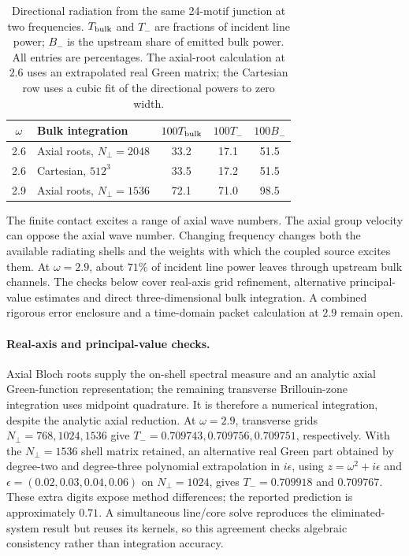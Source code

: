 \documentclass[10pt,aps,onecolumn,notitlepage,nofootinbib]{revtex4-2}
\begin{document}
\begin{table}[t]
 \squeezetable
 \caption{Directional radiation from the same 24-motif junction at two frequencies. $T_{\rm bulk}$ and $T_-$ are fractions of incident line power; $B_-$ is the upstream share of emitted bulk power. All entries are percentages. The axial-root calculation at $2.6$ uses an extrapolated real Green matrix; the Cartesian row uses a cubic fit of the directional powers to zero width.}
 \label{tab:pred-backward}
 \begin{ruledtabular}
 \begin{tabular}{clccc}
 $\omega$ & Bulk integration & $100T_{\rm bulk}$ & $100T_-$ & $100B_-$\\
 \hline
 2.6 & Axial roots, $N_\perp=2048$ & 33.2 & 17.1 & 51.5\\
 2.6 & Cartesian, $512^3$ & 33.5 & 17.2 & 51.5\\
 2.9 & Axial roots, $N_\perp=1536$ & 72.1 & 71.0 & 98.5\\
 \end{tabular}
 \end{ruledtabular}
\end{table}

The finite contact excites a range of axial wave numbers. The axial group
velocity can oppose the axial wave number. Changing frequency changes both
the available radiating shells and the weights with which the coupled
source excites them. At $\omega=2.9$, about $71\%$ of incident line power
leaves through upstream bulk channels. The checks below cover real-axis
grid refinement, alternative principal-value estimates and direct
three-dimensional bulk integration. A combined rigorous error enclosure
and a time-domain packet calculation at $2.9$ remain open.

\paragraph*{Real-axis and principal-value checks.}
Axial Bloch roots supply the on-shell spectral measure and an analytic axial Green-function representation; the remaining transverse Brillouin-zone integration uses midpoint quadrature. It is therefore a numerical integration, despite the analytic axial reduction. At $\omega=2.9$, transverse grids $N_\perp=768,1024,1536$ give $T_-=0.709743,0.709756,0.709751$, respectively. With the $N_\perp=1536$ shell matrix retained, an alternative real Green part obtained by degree-two and degree-three polynomial extrapolation in $i\epsilon$, using $z=\omega^2+i\epsilon$ and $\epsilon=(0.02,0.03,0.04,0.06)$ on $N_\perp=1024$, gives $T_-=0.709918$ and $0.709767$. These extra digits expose method differences; the reported prediction is approximately $0.71$. A simultaneous line/core solve reproduces the eliminated-system result but reuses its kernels, so this agreement checks algebraic consistency rather than integration accuracy.
\end{document}
